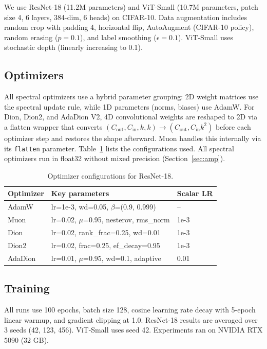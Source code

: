\documentclass[10pt,twocolumn]{article}
\begin{document}
We use ResNet-18 (11.2M parameters) and ViT-Small (10.7M parameters, patch size 4, 6 layers, 384-dim, 6 heads) on CIFAR-10. Data augmentation includes random crop with padding 4, horizontal flip, AutoAugment (CIFAR-10 policy), random erasing ($p=0.1$), and label smoothing ($\epsilon=0.1$). ViT-Small uses stochastic depth (linearly increasing to 0.1).

\subsection{Optimizers}

All spectral optimizers use a hybrid parameter grouping: 2D weight matrices use the spectral update rule, while 1D parameters (norms, biases) use AdamW. For Dion, Dion2, and AdaDion V2, 4D convolutional weights are reshaped to 2D via a flatten wrapper that converts $(C_\text{out}, C_\text{in}, k, k) \to (C_\text{out}, C_\text{in} k^2)$ before each optimizer step and restores the shape afterward. Muon handles this internally via its \texttt{flatten} parameter. Table~\ref{tab:optconfigs} lists the configurations used. All spectral optimizers run in float32 without mixed precision (Section~\ref{sec:amp}).

\begin{table}[t]
\centering
\caption{Optimizer configurations for ResNet-18.}
\label{tab:optconfigs}
\small
\begin{tabular}{@{}lll@{}}
\toprule
Optimizer & Key parameters & Scalar LR \\
\midrule
AdamW & lr=1e-3, wd=0.05, $\beta$=(0.9, 0.999) & -- \\
Muon & lr=0.02, $\mu$=0.95, nesterov, rms\_norm & 1e-3 \\
Dion & lr=0.02, rank\_frac=0.25, wd=0.01 & 1e-3 \\
Dion2 & lr=0.02, frac=0.25, ef\_decay=0.95 & 1e-3 \\
AdaDion & lr=0.01, $\mu$=0.95, wd=0.1, adaptive & 0.01 \\
\bottomrule
\end{tabular}
\end{table}

\subsection{Training}

All runs use 100 epochs, batch size 128, cosine learning rate decay with 5-epoch linear warmup, and gradient clipping at 1.0. ResNet-18 results are averaged over 3 seeds (42, 123, 456). ViT-Small uses seed 42. Experiments ran on NVIDIA RTX 5090 (32 GB).
\end{document}
